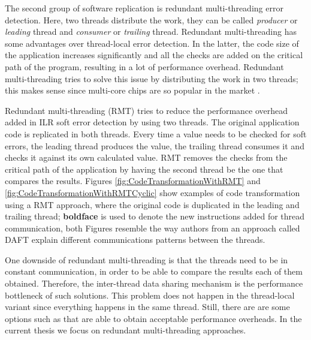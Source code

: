 The second group of software replication is redundant multi-threading error detection. Here, two threads distribute the work, they can be called \textit{producer} or \textit{leading} thread and \textit{consumer} or \textit{trailing} thread. Redundant multi-threading has some advantages over thread-local error detection. In the latter, the code size of the application increases significantly and all the checks are added on the critical path of the program, resulting in a lot of performance overhead. Redundant multi-threading tries to solve this issue by distributing the work in two threads; this makes sense since multi-core chips are so popular in the market \cite{mitropoulou2016comet}. 

Redundant multi-threading (RMT) \cite{mitropoulou2016comet} \cite{wang2007compiler} \cite{zhang2012daft} tries to reduce the performance overhead added in ILR soft error detection by using two threads. The original application code is replicated in both threads. Every time a value needs to be checked for soft errors, the leading thread produces the value, the trailing thread consumes it and checks it against its own calculated value. RMT removes the checks from the critical path of the application by having the second thread be the one that compares the results. Figures \ref{fig:CodeTransformationWithRMT} and \ref{fig:CodeTransformationWithRMTCyclic} show examples of code transformation using a RMT approach, where the original code is duplicated in the leading and trailing thread; \textbf{boldface} is used to denote the new instructions added for thread communication, both Figures resemble the way authors from an approach called DAFT \cite{zhang2012daft} explain different communications patterns between the threads.

One downside of redundant multi-threading is that the threads need to be in constant communication, in order to be able to compare the results each of them obtained. Therefore, the inter-thread data sharing mechanism is the performance bottleneck of such solutions. This problem does not happen in the thread-local variant since everything happens in the same thread. Still, there are are some options such as \cite{mitropoulou2016comet} \cite{wang2007compiler} \cite{zhang2012daft} that are able to obtain acceptable performance overheads. In the current thesis we focus on redundant multi-threading approaches.

